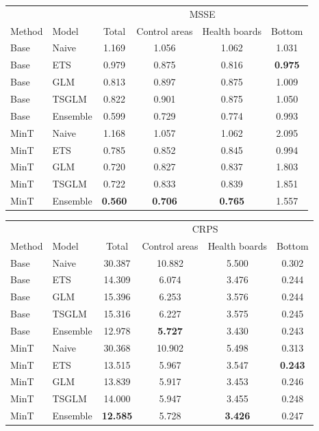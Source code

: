 \documentclass[
  authoryear,
  preprint,
  3p]{elsarticle}
\begin{document}
\begin{table}
\begin{minipage}[t]{\linewidth}
{\centering
\begin{tabular}[t]{llcccc}
\toprule
\multicolumn{2}{c}{ } & \multicolumn{4}{c}{MSSE} \\
\cmidrule(l{3pt}r{3pt}){3-6}
Method & Model & Total & Control areas & Health boards & Bottom\\
\midrule
Base & Naive & 1.169 & 1.056 & 1.062 & 1.031\\
Base & ETS & 0.979 & 0.875 & 0.816 & \textbf{0.975}\\
Base & GLM & 0.813 & 0.897 & 0.875 & 1.009\\
Base & TSGLM & 0.822 & 0.901 & 0.875 & 1.050\\
Base & Ensemble & 0.599 & 0.729 & 0.774 & 0.993\\
\addlinespace
MinT & Naive & 1.168 & 1.057 & 1.062 & 2.095\\
MinT & ETS & 0.785 & 0.852 & 0.845 & 0.994\\
MinT & GLM & 0.720 & 0.827 & 0.837 & 1.803\\
MinT & TSGLM & 0.722 & 0.833 & 0.839 & 1.851\\
MinT & Ensemble & \textbf{0.560} & \textbf{0.706} & \textbf{0.765} & 1.557\\
\bottomrule
\end{tabular}

}

\end{minipage}%
\newline
\begin{minipage}[t]{\linewidth}

{\centering 

\tabularnewline

\centering
\begin{tabular}[t]{llcccc}
\toprule
\multicolumn{2}{c}{ } & \multicolumn{4}{c}{CRPS} \\
\cmidrule(l{3pt}r{3pt}){3-6}
Method & Model & Total & Control areas & Health boards & Bottom\\
\midrule
Base & Naive & 30.387 & 10.882 & 5.500 & 0.302\\
Base & ETS & 14.309 & 6.074 & 3.476 & 0.244\\
Base & GLM & 15.396 & 6.253 & 3.576 & 0.244\\
Base & TSGLM & 15.316 & 6.227 & 3.575 & 0.245\\
Base & Ensemble & 12.978 & \textbf{5.727} & 3.430 & 0.243\\
\addlinespace
MinT & Naive & 30.368 & 10.902 & 5.498 & 0.313\\
MinT & ETS & 13.515 & 5.967 & 3.547 & \textbf{0.243}\\
MinT & GLM & 13.839 & 5.917 & 3.453 & 0.246\\
MinT & TSGLM & 14.000 & 5.947 & 3.455 & 0.248\\
MinT & Ensemble & \textbf{12.585} & 5.728 & \textbf{3.426} & 0.247\\
\bottomrule
\end{tabular}

}
\end{minipage}
\end{table}
\end{document}
